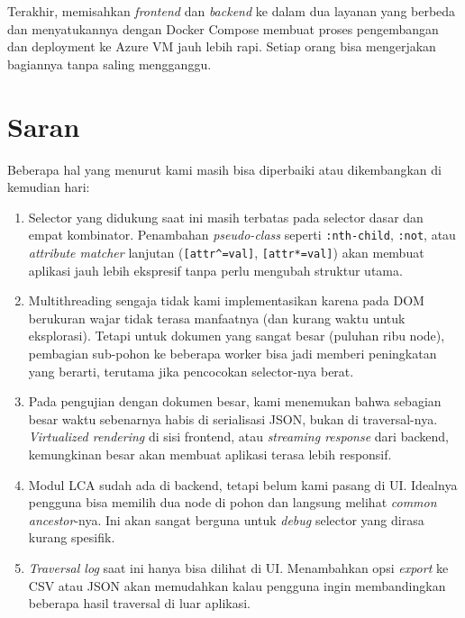 Terakhir, memisahkan \textit{frontend} dan \textit{backend} ke dalam dua layanan yang berbeda dan menyatukannya dengan Docker Compose membuat proses pengembangan dan deployment ke Azure VM jauh lebih rapi. Setiap orang bisa mengerjakan bagiannya tanpa saling mengganggu.

\section{Saran}

Beberapa hal yang menurut kami masih bisa diperbaiki atau dikembangkan di kemudian hari:

\begin{enumerate}
    \item Selector yang didukung saat ini masih terbatas pada selector dasar dan empat kombinator. Penambahan \textit{pseudo-class} seperti \texttt{:nth-child}, \texttt{:not}, atau \textit{attribute matcher} lanjutan (\texttt{[attr\textasciicircum=val]}, \texttt{[attr*=val]}) akan membuat aplikasi jauh lebih ekspresif tanpa perlu mengubah struktur utama.

    \item Multithreading sengaja tidak kami implementasikan karena pada DOM berukuran wajar tidak terasa manfaatnya (dan kurang waktu untuk eksplorasi). Tetapi untuk dokumen yang sangat besar (puluhan ribu node), pembagian sub-pohon ke beberapa worker bisa jadi memberi peningkatan yang berarti, terutama jika pencocokan selector-nya berat.

    \item Pada pengujian dengan dokumen besar, kami menemukan bahwa sebagian besar waktu sebenarnya habis di serialisasi JSON, bukan di traversal-nya. \textit{Virtualized rendering} di sisi frontend, atau \textit{streaming response} dari backend, kemungkinan besar akan membuat aplikasi terasa lebih responsif.

    \item Modul LCA sudah ada di backend, tetapi belum kami pasang di UI. Idealnya pengguna bisa memilih dua node di pohon dan langsung melihat \textit{common ancestor}-nya. Ini akan sangat berguna untuk \textit{debug} selector yang dirasa kurang spesifik.

    \item \textit{Traversal log} saat ini hanya bisa dilihat di UI. Menambahkan opsi \textit{export} ke CSV atau JSON akan memudahkan kalau pengguna ingin membandingkan beberapa hasil traversal di luar aplikasi.
\end{enumerate}
